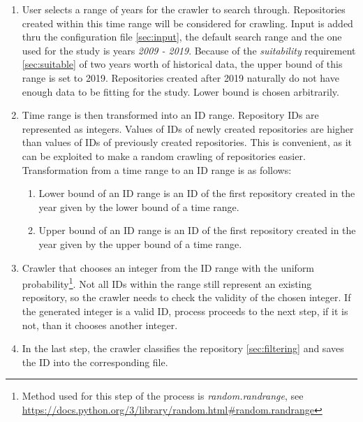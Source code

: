 \begin{enumerate}
    \item User selects a range of years for the crawler to search through.
    Repositories created within this time range will be considered for crawling.
    Input is added thru the configuration file \ref{sec:input}, the default search range and the one used for the study is years \emph{2009 - 2019}.
    Because of the \emph{suitability} requirement \ref{sec:suitable} of two years worth of historical data, the upper bound of this range is set to 2019.
    Repositories created after 2019 naturally do not have enough data to be fitting for the study.
    Lower bound is chosen arbitrarily.

    \item Time range is then transformed into an ID range.
    Repository IDs are represented as integers.
    Values of IDs of newly created repositories are higher than values of IDs of previously created repositories.
    This is convenient, as it can be exploited to make a random crawling of repositories easier.
    Transformation from a time range to an ID range is as follows:
    
    \begin{enumerate}
        \item Lower bound of an ID range is an ID of the first repository created in the year given by the lower bound of a time range.
        \item Upper bound of an ID range is an ID of the first repository created in the year given by the upper bound of a time range.
    \end{enumerate}

    \item Crawler that chooses an integer from the ID range with the uniform probability\footnote{Method used for this step of the process is \emph{random.randrange}, see \url{https://docs.python.org/3/library/random.html\#random.randrange}}.
    Not all IDs within the range still represent an existing repository, so the crawler needs to check the validity of the chosen integer.
    If the generated integer is a valid ID, process proceeds to the next step, if it is not, than it chooses another integer.

    \item In the last step, the crawler classifies the repository \ref{sec:filtering} and saves the ID into the corresponding file.
\end{enumerate}

